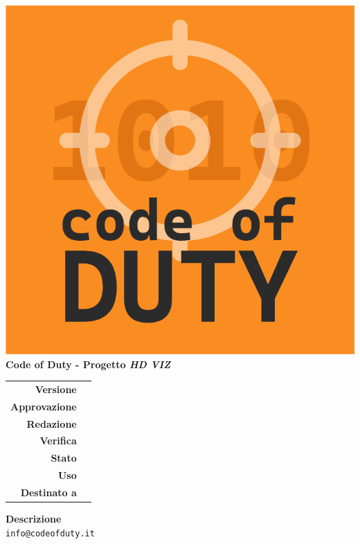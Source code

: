 %
%

\begin{titlepage}

	\begin{center}
		\includegraphics[scale = 0.5]{../_template/images/logo.png}\\
		\large \textbf{Code of Duty - Progetto \emph{HD VIZ}} \\
		\vfill
		\huge \textbf{\titolodocumento}
		\vspace*{\fill}
        
        \vfill
        \large
    \end{center}
    
	\begin{table}[htbp]
        \centering
        \begin{tabular}{r|l}
            \textbf{Versione} & \versione{} \\
            \textbf{Approvazione} & \approvazione{} \\
            \textbf{Redazione} & \redazione{} \\
            \textbf{Verifica} & \verifica{} \\
            \textbf{Stato} & \stato{} \\
            \textbf{Uso} & \uso{} \\
            \textbf{Destinato a} & \destinazione{}
        \end{tabular}
    \end{table}
    
    \begin{center}
        \vfill
        \normalsize
        \textbf{Descrizione}\\
		\descrizionedocumento
        \vfill
        \small
        \texttt{info@codeofduty.it}
	\end{center}
\end{titlepage}

%
